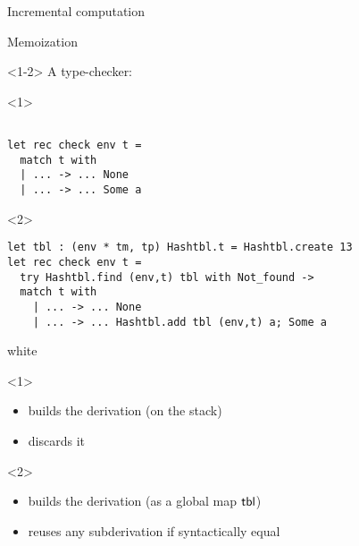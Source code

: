 \documentclass{beamer}
\theoremstyle{example}
\begin{document}
\begin{frame}[fragile]{Incremental computation}
  \begin{block}{Memoization}\vspace{0.5em}
    \begin{overlayarea}{\textwidth}{.7\textheight}
    \begin{onlyenv}<1-2>
      A type-checker:
      \begin{overlayarea}{\textwidth}{10em}
        \begin{onlyenv}<1>
          \begin{lstlisting}

let rec check env t =
  match t with
  | ... -> ... None
  | ... -> ... Some a
          \end{lstlisting}
        \end{onlyenv}
        \begin{onlyenv}<2>
          \begin{lstlisting}
let tbl : (env * tm, tp) Hashtbl.t = Hashtbl.create 13
let rec check env t =
  try Hashtbl.find (env,t) tbl with Not_found ->
  match t with
    | ... -> ... None
    | ... -> ... Hashtbl.add tbl (env,t) a; Some a
          \end{lstlisting}
        \end{onlyenv}
      \end{overlayarea}
      \begin{overlayarea}{\textwidth}{3em}
        \begin{beamercolorbox}{white}
          \begin{onlyenv}<1>
            \begin{itemize}
            \item builds the derivation (on the stack)
            \item discards it
            \end{itemize}
          \end{onlyenv}
          \begin{onlyenv}<2>
            \begin{itemize}
            \item builds the derivation (as a global map ${\rm\mathsf{tbl}}$)
            \item reuses any subderivation if syntactically equal
            \end{itemize}
          \end{onlyenv}
        \end{beamercolorbox}
      \end{overlayarea}
    \end{onlyenv}


\end{overlayarea}
\end{block}
\end{frame}
\end{document}

